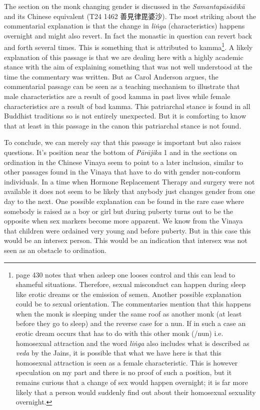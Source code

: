 The section on the monk changing gender is discussed in the {\em Samantapāsādikā} and its Chinese equivalent (T24 1462 善見律毘婆沙). The most striking about the commentarial explanation is that the change in {\em liṅga} (characteristics) happens overnight and might also revert. In fact the monastic in question can revert back and forth several times. This is something that is attributed to kamma\footnote{\cite{heirman} page 430 notes that when asleep one looses control and this can lead to shameful situations. Therefore, sexual misconduct can happen during sleep like erotic dreams or the emission of semen. Another possible explanation could be to sexual orientation. The commentaries mention that this happens when the monk is sleeping under the same roof as another monk (at least before they go to sleep) and the reverse case for a nun. If in such a case an erotic dream occurs that has to do with this other monk (/nun) i.e. homosexual attraction and the word {\em liṅga} also includes what is described as {\em veda} by the Jains, it is possible that what we have here is that this homosexual attraction is seen as a female characteristic. This is however speculation on my part and there is no proof of such a position, but it remains curious that a change of sex would happen overnight; it is far more likely that a person would suddenly find out about their homosexual sexuality overnight.}. A likely explanation of this passage is that we are dealing here with a highly academic stance with the aim of explaining something that was not well understood at the time the commentary was written. But as Carol Anderson argues, the commentarial passage can be seen as a teaching mechanism to illustrate that male characteristics are a result of good kamma in past lives while female characteristics are a result of bad kamma. This patriarchal stance is found in all Buddhist traditions so is not entirely unexpected. But it is comforting to know that at least in this passage in the canon this patriarchal stance is not found.

To conclude, we can merely say that this passage is important but also raises questions. It's position near the bottom of {\em Pārājika} 1 and in the sections on ordination in the Chinese Vinaya seem to point to a later inclusion, similar to other passages found in the Vinaya that have to do with gender non-conform individuals. In a time when Hormone Replacement Therapy and surgery were not available it does not seem to be likely that anybody just changes gender from one day to the next. One possible explanation can be found in the rare case where somebody is raised as a boy or girl but during puberty turns out to be the opposite when sex markers become more apparent. We know from the Vinaya that children were ordained very young and before puberty. But in this case this would be an intersex person. This would be an indication that intersex was not seen as an obstacle to ordination.


